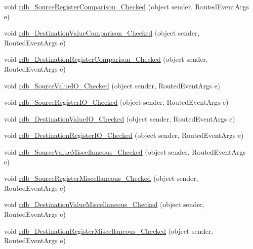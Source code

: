 \begin{DoxyCompactItemize}
\item 
void \hyperlink{class_c_p_u___o_s___simulator_1_1_instructions_window_a21a7262f1fc85de3f833bc1a88e1b384}{rdb\+\_\+\+Source\+Register\+Comparison\+\_\+\+Checked} (object sender, Routed\+Event\+Args e)
\item 
void \hyperlink{class_c_p_u___o_s___simulator_1_1_instructions_window_a8d499408578787c03f1e8ce58db03506}{rdb\+\_\+\+Destination\+Value\+Comparison\+\_\+\+Checked} (object sender, Routed\+Event\+Args e)
\item 
void \hyperlink{class_c_p_u___o_s___simulator_1_1_instructions_window_afacc5e2bbf9eae3af4d00a65824ac22d}{rdb\+\_\+\+Destination\+Register\+Comparison\+\_\+\+Checked} (object sender, Routed\+Event\+Args e)
\item 
void \hyperlink{class_c_p_u___o_s___simulator_1_1_instructions_window_aa84c68252386686704bfc50fc0013377}{rdb\+\_\+\+Source\+Value\+I\+O\+\_\+\+Checked} (object sender, Routed\+Event\+Args e)
\item 
void \hyperlink{class_c_p_u___o_s___simulator_1_1_instructions_window_a2bb662bda02027f69c3ac5eda1131bb5}{rdb\+\_\+\+Source\+Register\+I\+O\+\_\+\+Checked} (object sender, Routed\+Event\+Args e)
\item 
void \hyperlink{class_c_p_u___o_s___simulator_1_1_instructions_window_a6b3d3a23e92def88a459a22d3b020cf7}{rdb\+\_\+\+Destination\+Value\+I\+O\+\_\+\+Checked} (object sender, Routed\+Event\+Args e)
\item 
void \hyperlink{class_c_p_u___o_s___simulator_1_1_instructions_window_a7dd3bf48ece5f6e627be01710e7efed8}{rdb\+\_\+\+Destination\+Register\+I\+O\+\_\+\+Checked} (object sender, Routed\+Event\+Args e)
\item 
void \hyperlink{class_c_p_u___o_s___simulator_1_1_instructions_window_a245dad441fcbc7e910e7f2ab6d10563c}{rdb\+\_\+\+Source\+Value\+Miscellaneous\+\_\+\+Checked} (object sender, Routed\+Event\+Args e)
\item 
void \hyperlink{class_c_p_u___o_s___simulator_1_1_instructions_window_affbdaf2f0b660f1d0a96b06bb1d038d9}{rdb\+\_\+\+Source\+Register\+Miscellaneous\+\_\+\+Checked} (object sender, Routed\+Event\+Args e)
\item 
void \hyperlink{class_c_p_u___o_s___simulator_1_1_instructions_window_a71fc15afd802fb93c7991e437ef9fd19}{rdb\+\_\+\+Destination\+Value\+Miscellaneous\+\_\+\+Checked} (object sender, Routed\+Event\+Args e)
\item 
void \hyperlink{class_c_p_u___o_s___simulator_1_1_instructions_window_a1d014230db7d7462aba012a8d61cd2f3}{rdb\+\_\+\+Destination\+Register\+Miscellaneous\+\_\+\+Checked} (object sender, Routed\+Event\+Args e)

\end{DoxyCompactItemize}
